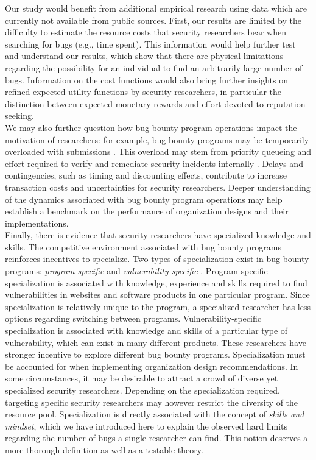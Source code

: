 Our study would benefit from additional empirical research using data which are currently not available from public sources. First, our results are limited by the difficulty to estimate the resource costs that security researchers bear when searching for bugs (e.g., time spent). This information would help further test and understand our results, which show that there are physical limitations regarding the possibility for an individual to find an arbitrarily large number of bugs. Information on the cost functions would also bring further insights on refined expected utility functions by security researchers, in particular the distinction between expected monetary rewards and effort devoted to reputation seeking.\\

We may also further question how bug bounty program operations impact the motivation of researchers: for example, bug bounty programs may be temporarily overloaded with submissions \cite{zhao2014exploratory,zhao2015empirical}. This overload may stem from priority queueing \cite{maillart2011quantification} and effort required to verify and remediate security incidents internally \cite{kuypers2016empirical}. Delays and contingencies, such as timing and discounting effects, contribute to increase transaction costs and uncertainties for security researchers. Deeper understanding of the dynamics associated with bug bounty program operations may help establish a benchmark on the performance of organization designs and their implementations.\\

Finally, there is evidence that security researchers have specialized knowledge and skills. The competitive environment associated with bug bounty programs reinforces incentives to specialize. Two types of specialization exist in bug bounty programs: {\it program-specific} and {\it vulnerability-specific} \cite{zhao2014exploratory,zhao2015empirical}. Program-specific specialization is associated with knowledge, experience and skills required to find vulnerabilities in websites and software products in one particular program. Since specialization is relatively unique to the program, a specialized researcher has less options regarding switching between programs. Vulnerability-specific specialization is associated with knowledge and skills of a particular type of vulnerability, which can exist in many different products. These researchers have stronger incentive to explore different bug bounty programs. Specialization must be accounted for when implementing organization design recommendations. In some circumstances, it may be desirable to attract a crowd of diverse yet specialized security researchers. Depending on the specialization required, targeting specific security researchers may however restrict the diversity of the resource pool. Specialization is directly associated with the concept of {\it skills and mindset}, which we have introduced here to explain the observed hard limits regarding the number of bugs a single researcher can find. This notion deserves a more thorough definition as well as a testable theory.\\





